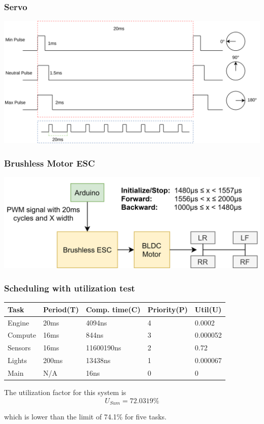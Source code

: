 \documentclass{beamer}
\begin{document}
\begin{frame}
    \frametitle{Servo}
    \includegraphics[width=\linewidth]{img/servo.png}
\end{frame}

\begin{frame}
    \frametitle{Brushless Motor ESC}
    \includegraphics[width=\linewidth]{img/brushless-motor-esc}
\end{frame}

\begin{frame}
    \frametitle{Scheduling with utilization test}
\begin{center}
 \begin{tabular}{||l l l l|l||}
 \hline
   Task & Period(T) & Comp. time(C) & Priority(P) & Util(U) \\ [0.5ex]
 \hline\hline
   Engine & 20ms & 4094ns & 4 & 0.0002 \\
 \hline
   Compute & 16ms & 844ns & 3 & 0.000052 \\
 \hline
   Sensors & 16ms & 11600190ns & 2 & 0.72 \\
 \hline
   Lights & 200ms & 13438ns & 1 & 0.000067 \\
 \hline
   Main & N/A & 16ns & 0 & 0 \\ [1ex]
 \hline
\end{tabular}
\end{center}

The utilization factor for this system is
\begin{equation*}
  U_{Sum} = 72.0319\%
\end{equation*}

which is lower than the limit of 74.1\% for five tasks.
\end{frame}
\end{document}
